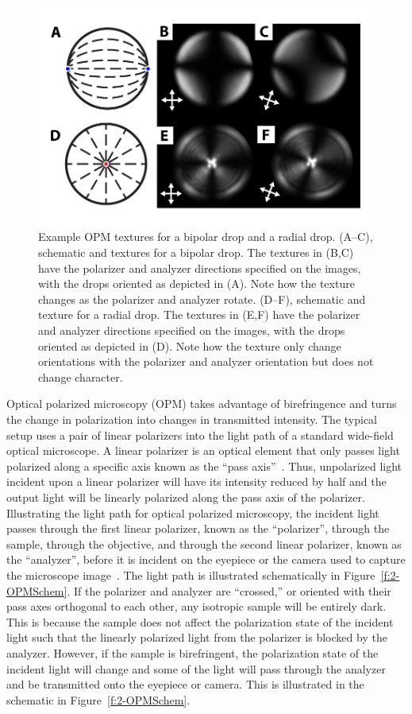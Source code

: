\begin{figure}[h]
  \centering
  \includegraphics{figures/C2/Ch2-Figs_OPMDrops.png}
  \caption{Example OPM textures for a bipolar drop and a radial drop.
  (A--C), schematic and textures for a bipolar drop.
  The textures in (B,C) have the polarizer and analyzer directions specified on the images, with the drops oriented as depicted in (A).
  Note how the texture changes as the polarizer and analyzer rotate.
  (D--F), schematic and texture for a radial drop.
  The textures in (E,F) have the polarizer and analyzer directions specified on the images, with the drops oriented as depicted in (D).
  Note how the texture only change orientations with the polarizer and analyzer orientation but does not change character.}\label{f:2-OPMDrops}
\end{figure}

Optical polarized microscopy (OPM) takes advantage of birefringence and turns the change in polarization into changes in transmitted intensity.
The typical setup uses a pair of linear polarizers into the light path of a standard wide-field optical microscope.
A linear polarizer is an optical element that only passes light polarized along a specific axis known as the ``pass axis''~\cite{RN232}.
Thus, unpolarized light incident upon a linear polarizer will have its intensity reduced by half and the output light will be linearly polarized along the pass axis of the polarizer.
Illustrating the light path for optical polarized microscopy, the incident light passes through the first linear polarizer, known as the ``polarizer'', through the sample, through the objective, and through the second linear polarizer, known as the ``analyzer'', before it is incident on the eyepiece or the camera used to capture the microscope image~\cite{RN232}.
The light path is illustrated schematically in Figure~\ref{f:2-OPMSchem}.
If the polarizer and analyzer are ``crossed,'' or oriented with their pass axes orthogonal to each other, any isotropic sample will be entirely dark.
This is because the sample does not affect the polarization state of the incident light such that the linearly polarized light from the polarizer is blocked by the analyzer.
However, if the sample is birefringent, the polarization state of the incident light will change and some of the light will pass through the analyzer and be transmitted onto the eyepiece or camera.
This is illustrated in the schematic in Figure~\ref{f:2-OPMSchem}.

